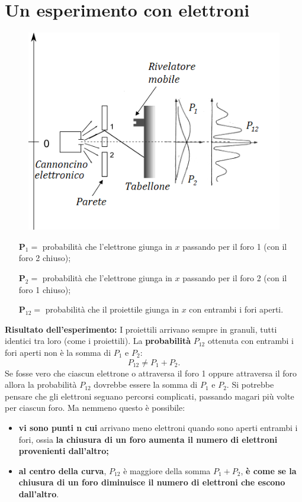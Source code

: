 \section*{Un esperimento con elettroni}
\begin{figure}[!htbp]
\begin{center}
\includegraphics[width=.6\textwidth]{immagini/cap_2/fig_2_3.png}
\end{center}
\end{figure}
\begin{itemize}
\item[\textbf{P$_1=$} ]probabilità che l'elettrone giunga in $x$ passando per il foro 1 (con il foro 2 chiuso);
\item[\textbf{P$_2=$} ]probabilità che l'elettrone giunga in $x$ passando per il foro 2 (con il foro 1 chiuso);
\item[\textbf{P$_{12}=$} ]probabilità che il proiettile giunga in $x$ con entrambi i fori aperti.
\end{itemize}
\textbf{Risultato dell'esperimento:} I proiettili arrivano sempre in granuli, tutti identici tra loro (come i proiettili). La \textbf{probabilità} $P_{12}$ ottenuta con entrambi i fori aperti non è la somma di $P_1$ e $P_2$:
\begin{equation}
P_{12}\neq P_1+P_2.
\end{equation}
Se fosse vero che ciascun elettrone o attraversa il foro 1 oppure attraversa il foro  allora la probabilità $P_{12}$ dovrebbe essere la somma di $P_1$ e $P_2$. Si potrebbe pensare che gli elettroni seguano percorsi complicati, passando magari più volte per ciascun foro. Ma nemmeno questo è possibile:
\begin{itemize}
\item \textbf{vi sono punti n cui} arrivano meno elettroni quando sono aperti entrambi i fori, ossia \textbf{la chiusura di un foro aumenta il numero di elettroni provenienti dall'altro;}
\item \textbf{al centro della curva}, $P_{12}$ è maggiore della somma $P_1 + P_2$,  \textbf{è come se la chiusura di un foro diminuisce il numero di elettroni che escono dall'altro}.
\end{itemize}
